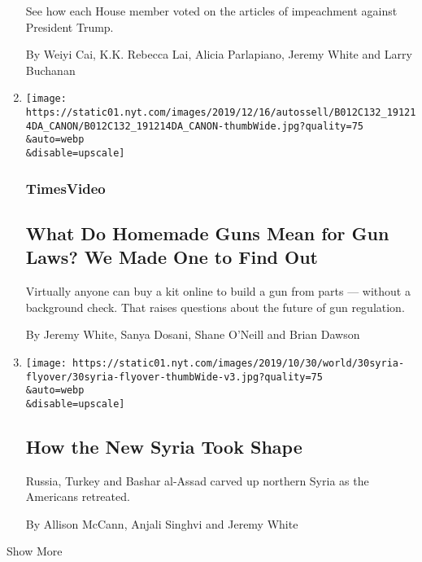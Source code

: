 \begin{enumerate}
  See how each House member voted on the articles of impeachment against
  President Trump.

  By Weiyi Cai, K.K. Rebecca Lai, Alicia Parlapiano, Jeremy White and
  Larry Buchanan
\item
  \href{/video/us/100000006827740/ghost-guns-untraceable-weapons.html}{}

  \texttt{[image: https://static01.nyt.com/images/2019/12/16/autossell/B012C132\_191214DA\_CANON/B012C132\_191214DA\_CANON-thumbWide.jpg?quality=75\\\&auto=webp\\\&disable=upscale]}

  \hypertarget{timesvideo}{%
  \subsubsection{TimesVideo}\label{timesvideo}}

  \hypertarget{what-do-homemade-guns-mean-for-gun-laws-we-made-one-to-find-out}{%
  \subsection{What Do Homemade Guns Mean for Gun Laws? We Made One to
  Find
  Out}\label{what-do-homemade-guns-mean-for-gun-laws-we-made-one-to-find-out}}

  Virtually anyone can buy a kit online to build a gun from parts ---
  without a background check. That raises questions about the future of
  gun regulation.

  By Jeremy White, Sanya Dosani, Shane O'Neill and Brian Dawson
\item
  \href{/interactive/2019/10/30/world/middleeast/syria-turkey-maps.html}{}

  \texttt{[image: https://static01.nyt.com/images/2019/10/30/world/30syria-flyover/30syria-flyover-thumbWide-v3.jpg?quality=75\\\&auto=webp\\\&disable=upscale]}

  \hypertarget{how-the-new-syria-took-shape}{%
  \subsection{How the New Syria Took
  Shape}\label{how-the-new-syria-took-shape}}

  Russia, Turkey and Bashar al-Assad carved up northern Syria as the
  Americans retreated.

  By Allison McCann, Anjali Singhvi and Jeremy White
\end{enumerate}

Show More


